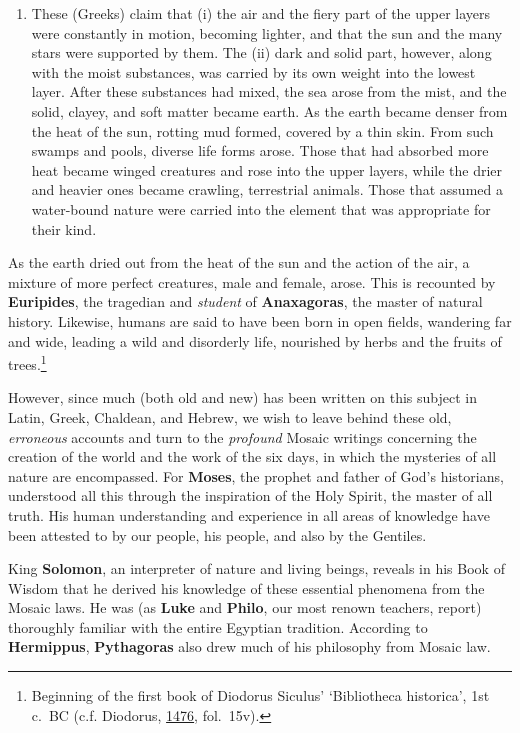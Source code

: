 \documentclass[
]{article}
\providecommand{\tightlist}{%
  \setlength{\itemsep}{0pt}\setlength{\parskip}{0pt}}
\begin{document}
\begin{enumerate}
\def\labelenumi{(\Roman{enumi})}
\tightlist
\item
  These (Greeks) claim that (i) the air and the fiery part of the upper
  layers were constantly in motion, becoming lighter, and that the sun
  and the many stars were supported by them. The (ii) dark and solid
  part, however, along with the moist substances, was carried by its own
  weight into the lowest layer. After these substances had mixed, the
  sea arose from the mist, and the solid, clayey, and soft matter became
  earth. As the earth became denser from the heat of the sun, rotting
  mud formed, covered by a thin skin. From such swamps and pools,
  diverse life forms arose. Those that had absorbed more heat became
  winged creatures and rose into the upper layers, while the drier and
  heavier ones became crawling, terrestrial animals. Those that assumed
  a water-bound nature were carried into the element that was
  appropriate for their kind.
\end{enumerate}

As the earth dried out from the heat of the sun and the action of the
air, a mixture of more perfect creatures, male and female, arose. This
is recounted by \textbf{Euripides}, the tragedian and \emph{student} of
\textbf{Anaxagoras}, the master of natural history. Likewise, humans are
said to have been born in open fields, wandering far and wide, leading a
wild and disorderly life, nourished by herbs and the fruits of
trees.\footnote{Beginning of the first book of Diodorus Siculus'
  `Bibliotheca historica', 1st c.~BC (c.f. Diodorus,
  \href{https://doi.org/10.3931/e-rara-68988}{1476}, fol.~15v).}

However, since much (both old and new) has been written on this subject
in Latin, Greek, Chaldean, and Hebrew, we wish to leave behind these
old, \emph{erroneous} accounts and turn to the \emph{profound} Mosaic
writings concerning the creation of the world and the work of the six
days, in which the mysteries of all nature are encompassed. For
\textbf{Moses}, the prophet and father of God's historians, understood
all this through the inspiration of the Holy Spirit, the master of all
truth. His human understanding and experience in all areas of knowledge
have been attested to by our people, his people, and also by the
Gentiles.

King \textbf{Solomon}, an interpreter of nature and living beings,
reveals in his Book of Wisdom that he derived his knowledge of these
essential phenomena from the Mosaic laws. He was (as \textbf{Luke} and
\textbf{Philo}, our most renown teachers, report) thoroughly familiar
with the entire Egyptian tradition. According to \textbf{Hermippus},
\textbf{Pythagoras} also drew much of his philosophy from Mosaic law.
\end{document}
